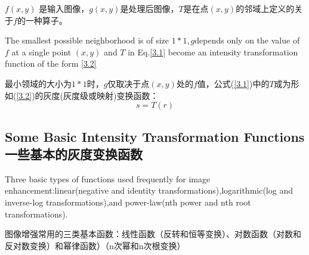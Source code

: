 \documentclass[a4paper,12pt]{article}
\numberwithin{equation}{section}%
\begin{document}
 $f(x,y)$ 是输入图像，$g(x,y)$是处理后图像，$T$是在点$(x,y)$的邻域上定义的关于$f$的一种算子。

The smallest possible neighborhood is of size $1*1,g$depends only on the value of $f$ at a single point $(x,y)$ and $T$ in Eq.\ref{3.1} become an intensity transformation function of the form \ref{3.2}

最小领域的大小为$1*1$时，$g$仅取决于点$(x,y)$处的$f$值，公式(\ref{3.1})中的$T$成为形如(\ref{3.2})的灰度(灰度级或映射)变换函数：
\begin{equation} \label{3.2}   %
 s=T(r) 
\end{equation}
\subsection{Some Basic Intensity Transformation Functions一些基本的灰度变换函数}

Three basic types of functions used frequently for image enhancement:linear(negative and identity transformations),logarithmic(log and inverse-log transformations),and power-law(nth power and nth root transformations).

图像增强常用的三类基本函数：线性函数（反转和恒等变换）、对数函数（对数和反对数变换）和幂律函数）（n次幂和n次根变换）
\end{document}
